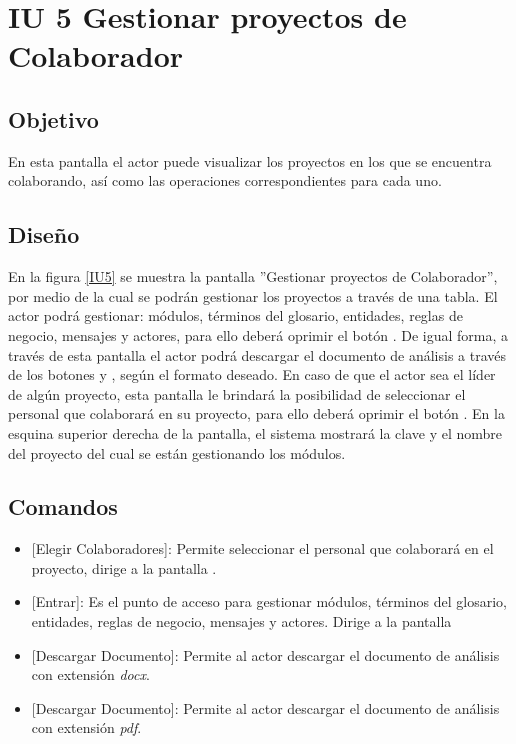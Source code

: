 \section{IU 5 Gestionar proyectos de Colaborador}

\subsection{Objetivo}
	En esta pantalla el actor puede visualizar los proyectos en los que se encuentra colaborando, así como las operaciones correspondientes para cada uno.
\subsection{Diseño}
	En la figura \ref{IU5} se muestra la pantalla ''Gestionar proyectos de Colaborador'', por medio de la cual se podrán gestionar los proyectos a través de una tabla. El actor podrá gestionar: módulos, términos del glosario, entidades, reglas de negocio, mensajes y actores, para ello deberá oprimir el botón . De igual forma, a través de esta pantalla el actor podrá descargar el documento de análisis a través de los botones 
	 y , según el formato deseado. En caso de que el actor sea el líder de algún proyecto,	esta pantalla le brindará la posibilidad de seleccionar el personal que colaborará en su proyecto, para ello deberá oprimir el botón .
	En la esquina superior derecha de la pantalla, el sistema mostrará la clave y el nombre del proyecto del cual se están gestionando los módulos.

\label{IU5}
\subsection{Comandos}
\begin{itemize}
	\item {} [Elegir Colaboradores]: Permite seleccionar el personal que colaborará en el proyecto, dirige a la pantalla .
	\item {} [Entrar]: Es el punto de acceso para gestionar módulos, términos del glosario, entidades, reglas de negocio, mensajes y actores. Dirige a la pantalla 
	\item {} [Descargar Documento]: Permite al actor descargar el documento de análisis con extensión {\em docx}.
	\item {} [Descargar Documento]: Permite al actor descargar el documento de análisis con extensión {\em pdf}.
\end{itemize}
